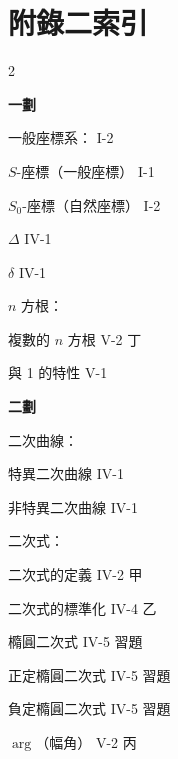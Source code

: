 \section*{附錄二\quad 索\qquad 引}
\label{sec:b4s_a2}

\setlength{\columnsep}{2em}
\begin{multicols}{2}

\begin{center}
\textbf{\large 一\quad 劃}
\end{center}

\noindent 一般座標系： \hfill I-2\par
\noindent\hspace*{1.5em} $S$-座標（一般座標） \hfill I-1\par
\noindent\hspace*{1.5em} $S_0$-座標（自然座標） \hfill I-2\par
\noindent $\Delta$ \hfill IV-1\par
\noindent $\delta$ \hfill IV-1\par
\noindent $n$ 方根：\par
\noindent\hspace*{1.5em} 複數的 $n$ 方根 \hfill V-2 丁\par
{} 與 1 的特性 \hfill V-1\par

\vspace{0.8em}
\begin{center}
\textbf{\large 二\quad 劃}
\end{center}

\noindent 二次曲線：\par
\noindent\hspace*{1.5em} 特異二次曲線 \hfill IV-1\par
\noindent\hspace*{1.5em} 非特異二次曲線 \hfill IV-1\par
\noindent 二次式：\par
\noindent\hspace*{1.5em} 二次式的定義 \hfill IV-2 甲\par
\noindent\hspace*{1.5em} 二次式的標準化 \hfill IV-4 乙\par
\noindent\hspace*{1.5em} 橢圓二次式 \hfill IV-5 習題\par
\noindent\hspace*{1.5em} 正定橢圓二次式 \hfill IV-5 習題\par
\noindent\hspace*{1.5em} 負定橢圓二次式 \hfill IV-5 習題\par
\noindent $\arg$（幅角） \hfill V-2 丙\par


\end{multicols}
